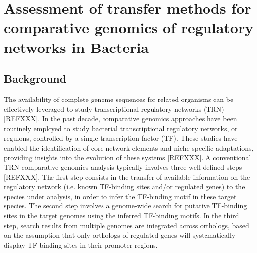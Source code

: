 
\chapter{Assessment of transfer methods for comparative genomics of regulatory
networks in Bacteria }

\section{Background}

The availability of complete genome sequences for related organisms can be
effectively leveraged to study transcriptional regulatory networks (TRN)
[REFXXX]. In the past decade, comparative genomics approaches have been
routinely employed to study bacterial transcriptional regulatory networks, or
regulons, controlled by a single transcription factor (TF). These studies have
enabled the identification of core network elements and niche-specific
adaptations, providing insights into the evolution of these systems
[REFXXX]. A conventional TRN comparative genomics analysis typically involves
three well-defined steps [REFXXX]. The first step consists in the transfer of
available information on the regulatory network (i.e. known TF-binding sites
and/or regulated genes) to the species under analysis, in order to infer the
TF-binding motif in these target species. The second step involves a
genome-wide search for putative TF-binding sites in the target genomes using
the inferred TF-binding motifs. In the third step, search results from multiple
genomes are integrated across orthologs, based on the assumption that only
orthologs of regulated genes will systematically display TF-binding sites in
their promoter regions.

